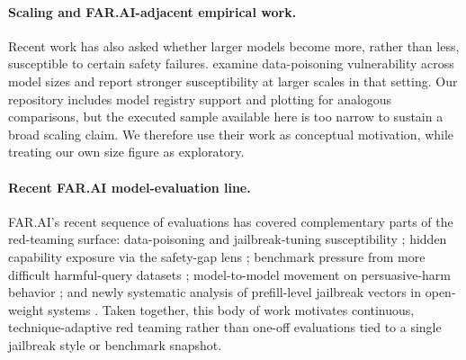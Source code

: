 \paragraph{Scaling and FAR.AI-adjacent empirical work.}
Recent work has also asked whether larger models become more, rather than less,
susceptible to certain safety failures. \citet{bowen2024scalingtrends} examine
data-poisoning vulnerability across model sizes and report stronger
susceptibility at larger scales in that setting. Our repository includes model
registry support and plotting for analogous comparisons, but the executed sample
available here is too narrow to sustain a broad scaling claim. We therefore use
their work as conceptual motivation, while treating our own size figure as
exploratory.

\paragraph{Recent FAR.AI model-evaluation line.}
FAR.AI's recent sequence of evaluations has covered complementary parts of the
red-teaming surface: data-poisoning and jailbreak-tuning susceptibility
\citep{bowen2024scalingtrends,murphy2025jailbreaktuning}; hidden capability
exposure via the safety-gap lens \citep{dombrowski2025safetygap}; benchmark
pressure from more difficult harmful-query datasets
\citep{hollinsworth2025clearharm}; model-to-model movement on persuasive-harm
behavior \citep{kowal2026persuasion}; and newly systematic analysis of
prefill-level jailbreak vectors in open-weight systems
\citep{struppek2026prefill}. Taken together, this body of work motivates
continuous, technique-adaptive red teaming rather than one-off evaluations tied
to a single jailbreak style or benchmark snapshot.

